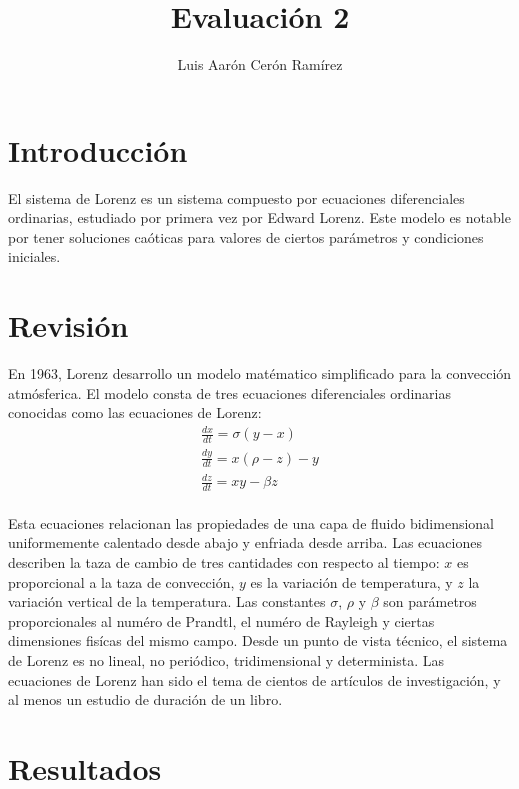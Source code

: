 \documentclass{article}
\title{Evaluación 2}
\author{Luis Aarón Cerón Ramírez}
\begin{document}
\maketitle
\section{Introducción}
El sistema de Lorenz es un sistema compuesto por ecuaciones diferenciales ordinarias, estudiado por primera vez por Edward Lorenz. Este modelo es notable por tener soluciones caóticas para valores de ciertos parámetros y condiciones iniciales.

\section{Revisión}
En 1963, Lorenz desarrollo un modelo matématico simplificado para la convección atmósferica. El modelo consta de tres ecuaciones diferenciales ordinarias conocidas como las ecuaciones de Lorenz:
\begin{equation*}
\begin{aligned}
\frac{dx}{dt}= \sigma(y-x)\\
\frac{dy}{dt}= x(\rho-z)-y\\
\frac{dz}{dt}= xy- \beta z\\
\end{aligned}
\end{equation*}

Esta ecuaciones relacionan las propiedades de una capa de fluido bidimensional uniformemente calentado desde abajo y enfriada desde arriba.
\newline
Las ecuaciones describen la taza de cambio de tres cantidades con respecto al tiempo: $x$ es proporcional a la taza de convección, $y$ es la variación de temperatura, y $z$ la variación vertical de la temperatura. Las constantes $\sigma$, $\rho$ y $\beta$ son parámetros proporcionales al numéro de Prandtl, el numéro de Rayleigh y ciertas dimensiones fisícas del mismo campo.
\newline
Desde un punto de vista técnico, el sistema de Lorenz es no lineal, no periódico, tridimensional y determinista. Las ecuaciones de Lorenz han sido el tema de cientos de artículos de investigación, y al menos un estudio de duración de un libro.

\section{Resultados}
\end{document}
